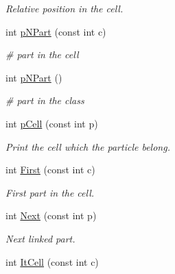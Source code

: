 \begin{DoxyCompactItemize}
\begin{DoxyCompactList}\small\item\em \-Relative position in the cell. \end{DoxyCompactList}\item 
\hypertarget{classDdLinkedList_a6a2d62432ffa4c509f4a7f1fb5aa7630}{int \hyperlink{classDdLinkedList_a6a2d62432ffa4c509f4a7f1fb5aa7630}{p\-N\-Part} (const int c)}\label{classDdLinkedList_a6a2d62432ffa4c509f4a7f1fb5aa7630}

\begin{DoxyCompactList}\small\item\em \# part in the cell \end{DoxyCompactList}\item 
\hypertarget{classDdLinkedList_a388622b5e7d2ad20e8ac1a8a951d655f}{int \hyperlink{classDdLinkedList_a388622b5e7d2ad20e8ac1a8a951d655f}{p\-N\-Part} ()}\label{classDdLinkedList_a388622b5e7d2ad20e8ac1a8a951d655f}

\begin{DoxyCompactList}\small\item\em \# part in the class \end{DoxyCompactList}\item 
\hypertarget{classDdLinkedList_a2d9507d25b2164c0bf4282b38b4a5d88}{int \hyperlink{classDdLinkedList_a2d9507d25b2164c0bf4282b38b4a5d88}{p\-Cell} (const int p)}\label{classDdLinkedList_a2d9507d25b2164c0bf4282b38b4a5d88}

\begin{DoxyCompactList}\small\item\em \-Print the cell which the particle belong. \end{DoxyCompactList}\item 
\hypertarget{classDdLinkedList_aafe289a3b1eb08ed1b960f1f93e8d836}{int \hyperlink{classDdLinkedList_aafe289a3b1eb08ed1b960f1f93e8d836}{\-First} (const int c)}\label{classDdLinkedList_aafe289a3b1eb08ed1b960f1f93e8d836}

\begin{DoxyCompactList}\small\item\em \-First part in the cell. \end{DoxyCompactList}\item 
\hypertarget{classDdLinkedList_a8b3b22221e5f8d516a2c4818bea703ad}{int \hyperlink{classDdLinkedList_a8b3b22221e5f8d516a2c4818bea703ad}{\-Next} (const int p)}\label{classDdLinkedList_a8b3b22221e5f8d516a2c4818bea703ad}

\begin{DoxyCompactList}\small\item\em \-Next linked part. \end{DoxyCompactList}\item 
\hypertarget{classDdLinkedList_af415aae03ca33a44460cc0a84bda0f6d}{int \hyperlink{classDdLinkedList_af415aae03ca33a44460cc0a84bda0f6d}{\-It\-Cell} (const int c)}\label{classDdLinkedList_af415aae03ca33a44460cc0a84bda0f6d}


\end{DoxyCompactItemize}
